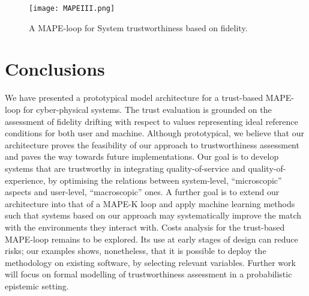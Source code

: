 \documentclass{article}
\begin{document}
\begin{figure}
\centerline{\texttt{[image: MAPEIII.png]}}
\caption{A MAPE-loop for System trustworthiness based on fidelity.}
\label{fig6}
\end{figure}



\section{Conclusions}\label{s:end}


We have presented a prototypical model architecture for a trust-based MAPE-loop for cyber-physical systems. The trust evaluation is grounded on the assessment of fidelity drifting with respect to values representing
ideal reference conditions for both user and machine.
Although prototypical, we believe that our architecture proves the feasibility of our approach to trustworthiness assessment
and paves the way towards future implementations.
Our goal is to develop systems that are trustworthy in integrating quality-of-service and quality-of-experience, by optimising the  relations between system-level, ``microscopic'' aspects and user-level, ``macroscopic'' ones.
A further goal is to extend our architecture into that of a MAPE-K loop and apply machine learning methods
such that systems based on our approach may systematically improve the match with the environments
they interact with.
Costs analysis for the trust-based MAPE-loop remains to be explored. Its use at early stages of design can reduce risks; our examples shows, nonetheless, that it is possible to deploy the methodology on existing software, by selecting relevant variables. Further work will focus on formal modelling of  trustworthiness assessment in a probabilistic epistemic setting.

















\end{document}
